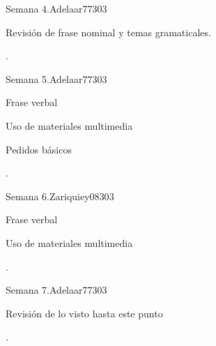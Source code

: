 \begin{syllabus}
\begin{unit}{Semana 4.}{}{Adelaar77}{30}{3}
   \begin{topics}
      \item Revisión de frase nominal y temas gramaticales.
   \end{topics}

   \begin{learningoutcomes}
      \item .
   \end{learningoutcomes}
\end{unit}

\begin{unit}{Semana 5.}{}{Adelaar77}{30}{3}
   \begin{topics}
      \item Frase verbal
      \item Uso de materiales multimedia
      \item Pedidos básicos
   \end{topics}

   \begin{learningoutcomes}
      \item .
   \end{learningoutcomes}
\end{unit}

\begin{unit}{Semana 6.}{}{Zariquiey08}{30}{3}
   \begin{topics}
      \item Frase verbal
      \item Uso de materiales multimedia
   \end{topics}

   \begin{learningoutcomes}
      \item .
   \end{learningoutcomes}
\end{unit}

\begin{unit}{Semana 7.}{}{Adelaar77}{30}{3}
   \begin{topics}
      \item Revisión de lo visto hasta este punto
   \end{topics}

   \begin{learningoutcomes}
      \item .
   \end{learningoutcomes}
\end{unit}


\end{syllabus}

